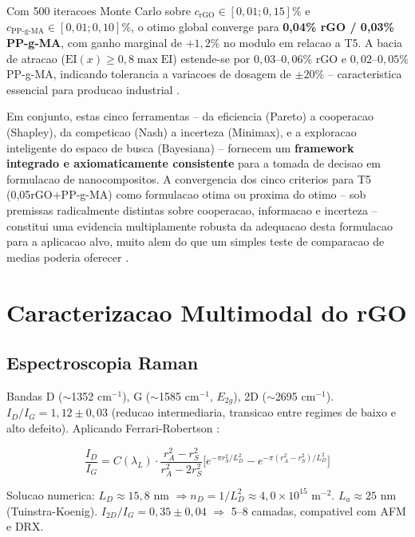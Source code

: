 \documentclass[11pt,a4paper,oneside]{article}
\begin{document}
Com 500 iteracoes Monte Carlo sobre $c_{\text{rGO}}\in[0{,}01;0{,}15]\%$ e $c_{\text{PP-g-MA}}\in[0{,}01;0{,}10]\%$,
o otimo global converge para {\bfseries 0,04\% rGO / 0,03\% PP-g-MA}, com ganho marginal de
$+1{,}2\%$ no modulo em relacao a T5. A bacia de atracao ($\text{EI}(x)\ge0{,}8\max\text{EI}$)
estende-se por $0{,}03$--$0{,}06\%$ rGO e $0{,}02$--$0{,}05\%$ PP-g-MA, indicando tolerancia a
variacoes de dosagem de $\pm20\%$ -- caracteristica essencial para producao industrial
\cite{Jones1998}.

Em conjunto, estas cinco ferramentas -- da eficiencia (Pareto) a cooperacao (Shapley), da
competicao (Nash) a incerteza (Minimax), e a exploracao inteligente do espaco de busca (Bayesiana) --
fornecem um {\bfseries framework integrado e axiomaticamente consistente} para a tomada de decisao
em formulacao de nanocompositos. A convergencia dos cinco criterios para T5 (0,05rGO+PP-g-MA)
como formulacao otima ou proxima do otimo -- sob premissas radicalmente distintas sobre cooperacao,
informacao e incerteza -- constitui uma evidencia multiplamente robusta da adequacao desta
formulacao para a aplicacao alvo, muito alem do que um simples teste de comparacao de medias
poderia oferecer \cite{Myerson1991}.


\section{Caracterizacao Multimodal do rGO}

\subsection{Espectroscopia Raman}

Bandas D (${\sim}$1352 cm$^{-1}$), G (${\sim}$1585 cm$^{-1}$, $E_{2g}$), 2D (${\sim}$2695 cm$^{-1}$). $I_D/I_G{=}1{,}12{\pm}0{,}03$ (reducao intermediaria, transicao entre regimes de baixo e alto defeito). Aplicando Ferrari-Robertson \cite{Ferrari2000}:

\begin{equation}
\frac{I_D}{I_G}{=}C(\lambda_L){\cdot}\frac{r_A^2{-}r_S^2}{r_A^2{-}2r_S^2}\bigl[e^{-\pi r_S^2/L_D^2}{-}e^{-\pi(r_A^2{-}r_S^2)/L_D^2}\bigr]
\end{equation}

Solucao numerica: $L_D{\approx}15{,}8$ nm $\Rightarrow n_D{=}1/L_D^2{\approx}4{,}0{\times}10^{15}$ m$^{-2}$. $L_a{\approx}25$ nm (Tuinstra-Koenig). $I_{2D}/I_G{=}0{,}35{\pm}0{,}04$ $\Rightarrow$ 5--8 camadas, compativel com AFM e DRX.
\end{document}
